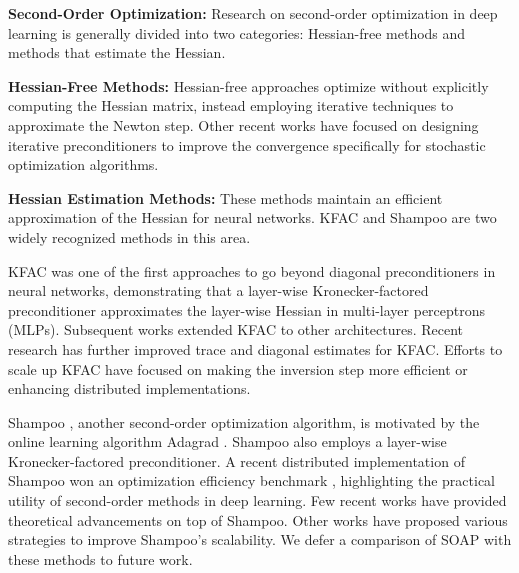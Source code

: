 \documentclass{article} %
\begin{document}
\textbf{Second-Order Optimization:} Research on second-order optimization in deep 
learning is generally divided into two categories: Hessian-free methods and methods 
that estimate the Hessian.

\textbf{Hessian-Free Methods:} Hessian-free approaches \citep{martens10, martens15} 
optimize without explicitly computing the Hessian matrix, instead employing iterative 
techniques to approximate the Newton step. Other recent works \citep{li18psgd, 
li2024stochastichessianfittingslie, pooladzandi2024curvatureinformed} have focused on 
designing iterative preconditioners to improve the convergence specifically for stochastic
optimization algorithms.

\textbf{Hessian Estimation Methods:} These methods maintain an efficient 
approximation of the Hessian for neural networks. KFAC \citep{martens15} and Shampoo 
\citep{shampoo} are two widely recognized methods in this area.

KFAC \citep{martens15} was one of the first approaches to go beyond diagonal 
preconditioners in neural networks, demonstrating that a layer-wise Kronecker-factored 
preconditioner approximates the layer-wise Hessian in multi-layer perceptrons (MLPs). 
Subsequent works \citep{martens2018kroneckerrecurrent, kazuki19} extended KFAC to other 
architectures. Recent research \citep{ekfac, Gao_Liu_Huang_Wang_Wang_Xu_Yu_2021} has 
further improved trace and diagonal estimates for KFAC. Efforts to scale up KFAC 
\citep{ba2017distributed, Puiu22, puiu2023brandnewkfacsspeeding, eschenhagen2023kroneckerfactored} 
have focused on making the inversion step more efficient or enhancing distributed 
implementations.

Shampoo \citep{shampoo}, another second-order optimization algorithm, is motivated by 
the online learning algorithm Adagrad \citep{JMLR:v12:duchi11a}. Shampoo also employs 
a layer-wise Kronecker-factored preconditioner. A recent distributed implementation of 
Shampoo \citep{distributedshampoo} won an optimization efficiency benchmark 
\citep{dahl2023benchmarking}, highlighting the practical utility of second-order methods 
in deep learning. Few recent works \citep{caspr, whyshampoo} have provided theoretical advancements on top of Shampoo. Other works \citep{anil2020scalable, peirson2022fishy, wulin2024, 
4bitshampoo} have proposed various strategies to improve Shampoo’s scalability. We defer 
a comparison of SOAP with these methods to future work.
\end{document}
